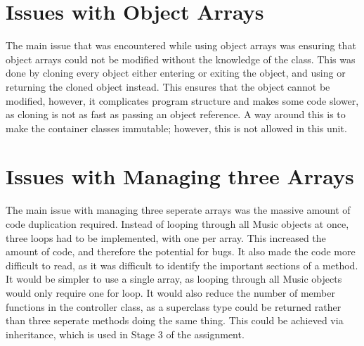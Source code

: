 \documentclass{article}
\begin{document}
\section{Issues with Object Arrays}
The main issue that was encountered while using object arrays was
ensuring that object arrays could not be modified without the knowledge of
the class. This was done by cloning every object either entering or exiting
the object, and using or returning the cloned object instead. This ensures
that the object cannot be modified, however, it complicates program structure
and makes some code slower, as cloning is not as fast as passing an object
reference. A way around this is to make the container classes immutable;
however, this is not allowed in this unit.

\section{Issues with Managing three Arrays}
The main issue with managing three seperate arrays was the massive amount of
code duplication required. Instead of looping through all Music objects at
once, three loops had to be implemented, with one per array. This increased
the amount of code, and therefore the potential for bugs. It also made
the code more difficult to read,
as it was difficult to identify the important
sections of a method. It would be simpler to use a single array, as
looping through all Music objects would only require one for loop. It would
also reduce the number of member functions in the controller class,
as a superclass type could be returned rather than three seperate methods
doing the same thing. This could be achieved via inheritance, which is used
in Stage 3 of the assignment.
\end{document}

